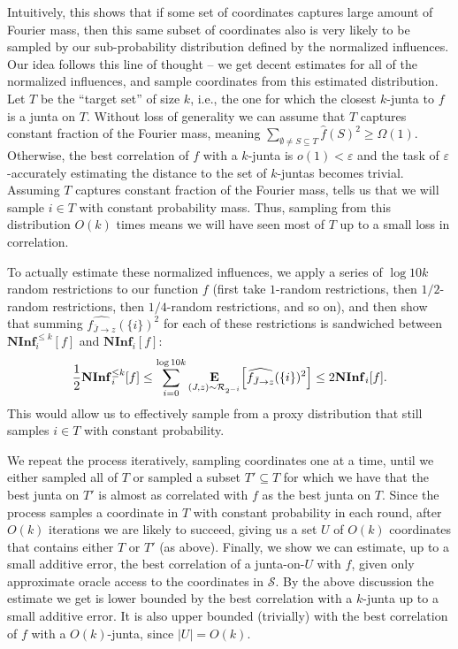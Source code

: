 \documentclass[10pt,a4paper]{article}
\newcommand{\say}[1]{``#1''}
\theoremstyle{plain}
\theoremstyle{remark}
\theoremstyle{plain}
\providecommand{\E}{}
\renewcommand{\E}{\mathop{\bf E\/}}
\newcommand{\bigbracket}[1]{\Bigl [ #1 \Bigr ]}
\newcommand\NormInf{{\mathbf{NInf}}}
\newcommand{\eps}{\varepsilon}
\renewcommand{\hat}{\widehat}
\newcommand{\calR}{\mathcal{R}}
\newcommand{\calS}{\mathcal{S}}
\newcommand{\InfluentialCoords}{\calS}
\newcommand{\Restrictedf}{f_{\bar{J}\to z}}
\begin{document}
Intuitively, this shows that if some set of coordinates captures large amount of Fourier mass, then this same subset of coordinates also is very likely to be sampled by our sub-probability distribution defined by the normalized influences. Our idea follows this line of thought -- we get decent estimates for all of the normalized influences, and sample coordinates from this estimated distribution. 
%
Let $T$ be the \say{target set} of size $k$, i.e., the one for which the closest $k$-junta to $f$ is a junta on $T$.
Without loss of generality we can assume that $T$ captures constant fraction of the Fourier mass, meaning $\sum_{\emptyset \neq S \subseteq T}\hat{f}(S)^2\ge \Omega(1)$. Otherwise, the best correlation of $f$ with a $k$-junta is $o(1) < \eps$ and the task of $\eps$-accurately estimating the distance to the set of $k$-juntas becomes trivial.
Assuming  $T$ captures constant fraction of the Fourier mass,   tells us that we will sample $i \in T$ with constant probability mass. Thus, sampling from this distribution $O(k)$ times means we will have seen most of $T$ up to a small loss in correlation. 

To actually estimate these normalized influences, we apply a series of $\log 10k$ random restrictions to our function $f$ (first take $1$-random restrictions, then $1/2$-random restrictions, then $1/4$-random restrictions, and so on), and then show that summing $\hat{\Restrictedf}(\{i\})^2$ for each of these restrictions is sandwiched between $\NormInf_i^{\leq k}[f]$ and $\NormInf_i[f]$:
$$\frac{1}{2}\NormInf_i^{\leq k}[f] \leq \sum_{i=0}^{\log 10k} \E_{(J,z) \sim \calR_{2^{-i}}}\bigbracket{\hat{\Restrictedf}(\{i\})^2} \leq 2\NormInf_i[f].$$ 
This would allow us to effectively sample from a proxy distribution that still samples  $i \in T$  with constant probability.


%
We repeat the process iteratively, sampling coordinates one at a time, until we either sampled all of $T$ or sampled a subset $T' \subseteq T$ for which we have that the best junta on $T'$ is almost as correlated with $f$ as the best junta on $T$. Since the process samples a coordinate in $T$ with constant probability in each round, after $O(k)$ iterations we are likely to succeed, giving us a set $U$ of $O(k)$ coordinates that contains either $T$ or $T'$ (as above).
Finally, we show we can estimate, up to a small additive error, the best correlation of a junta-on-$U$ with $f$, given only approximate oracle access to the coordinates in $\InfluentialCoords$. By the above discussion the estimate we get is lower bounded by the best correlation with a $k$-junta up to a small additive error. It is also upper bounded (trivially) with the best correlation of $f$ with a $O(k)$-junta, since $|U| = O(k)$.
\end{document}
